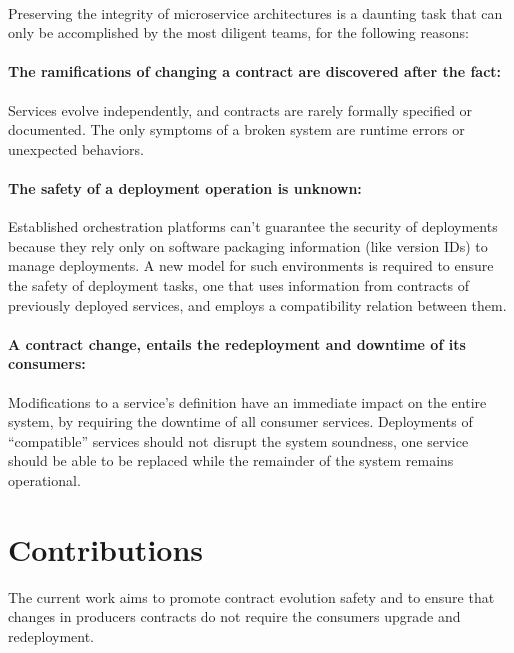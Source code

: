 \paragraph{}

Preserving the integrity of microservice architectures is a daunting task that can only be accomplished by the most diligent teams, for the following reasons:

\paragraph{ The ramifications of changing a contract are discovered after the fact:}
Services evolve independently, and contracts are rarely formally specified or documented.
The only symptoms of a broken system are runtime errors or unexpected behaviors.

\paragraph{ The safety of a deployment operation is unknown:}
Established orchestration platforms can't guarantee the security of deployments because they rely only on software packaging information (like version IDs) to manage deployments.
A new model for such environments is required to ensure the safety of deployment tasks, one that uses information from contracts of previously deployed services,
 and employs a compatibility relation between them.

\paragraph{ A contract change, entails the redeployment and downtime of its consumers:}
Modifications to a service's definition have an immediate impact on the entire system, by requiring the downtime of all consumer services.
Deployments of “compatible” services should not disrupt the system soundness,
one service should be able to be replaced while the remainder of the system remains operational.

\section{Contributions} %
\label{sec:contributions}

The current  work  aims to promote contract evolution safety and to ensure that changes in producers contracts do not require the consumers upgrade and redeployment.

\paragraph{}


